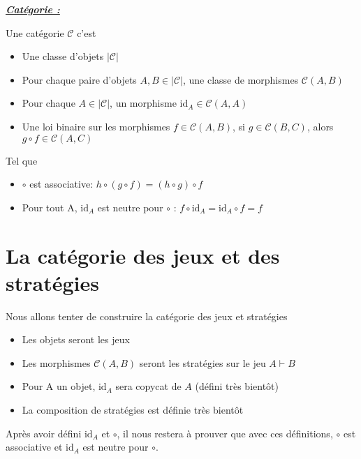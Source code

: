 \documentclass[a4paper,12ptCOUCOU
]{article}
\newlength{\mydepth}
\newlength{\myheight}
\newenvironment{answer}
{\par\begin{lrbox}{\mybox}\quad\begin{minipage}{\linewidth}\color{black}\setlength{\parskip}{10pt plus 1pt minus 1pt}\vspace*{-.7\baselineskip}}
{\end{minipage}\end{lrbox}
\settodepth{\mydepth}{\usebox{\mybox}}
\settoheight{\myheight}{\usebox{\mybox}}
\addtolength{\myheight}{\mydepth}
\noindent\makebox[0pt]{
  \color{gray}\hspace{-0pt}\rule[-\mydepth]{1pt}{\myheight}}
\usebox{\mybox}
  }
\begin{document}
\begin{samepage}\textbf{\textit{\underline{ Catégorie : }}} \begin{answer}
Une catégorie $\mathcal{C}$ c'est
\begin{itemize}
\item Une classe d'objets $|\mathcal{C}|$

\item Pour chaque paire d'objets $A, B \in |\mathcal{C}|$, une classe de
morphismes $\mathcal{C}(A,B)$

\item Pour chaque $A \in |\mathcal{C}|$, un morphisme
$\text{id}_A \in \mathcal{C}(A,A)$

\item Une loi binaire sur les morphismes
$f \in \mathcal{C}(A,B)$, si $g \in \mathcal{C}(B,C)$, alors
$g \circ f \in \mathcal{C}(A,C)$
\end{itemize}
Tel que
\begin{itemize}
\item $\circ$ est associative:
$h \circ (g \circ f) = (h \circ g) \circ f$

\item Pour tout A, $\text{id}_A$ est neutre pour $\circ$ :
$f \circ \text{id}_A = \text{id}_A \circ f = f$
\end{itemize}

\end{answer}\end{samepage}

\section{La catégorie des jeux et des stratégies}

Nous allons tenter de construire la catégorie des jeux et stratégies

\begin{itemize}
\item Les objets seront les jeux
\item Les morphismes $\mathcal{C}(A,B)$ seront les stratégies sur le jeu $A \vdash B$
\item Pour A un objet, $\text{id}_A$ sera copycat de $A$ (défini très bientôt)
\item La composition de stratégies est définie très bientôt
\end{itemize}

Après avoir défini $\text{id}_A$ et $\circ$, il nous restera à prouver
que avec ces définitions, $\circ$ est associative et $\text{id}_A$ est neutre
pour $\circ$.
\end{document}
